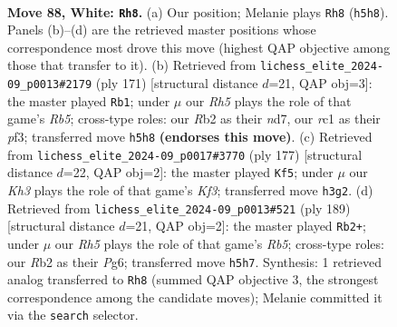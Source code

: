 \documentclass[11pt]{article}
\begin{document}
\clearpage

\begin{figure}[p]\centering
\begin{subfigure}{0.46\textwidth}\centering
\resizebox{\linewidth}{!}{%
\newchessgame
\chessboard[
  setfen={8/5k2/4pp2/7R/P3P3/5P1K/1R6/2r5 w - - 2 88},
  showmover=false,
  pgfstyle=straightmove, color=movearrow, markmove={h5-h8}
]}
\caption{}
\end{subfigure}\hfill
\begin{subfigure}{0.46\textwidth}\centering
\resizebox{\linewidth}{!}{%
\newchessgame
\chessboard[
  setfen={8/3N4/6p1/P5P1/1r1k3P/5PK1/8/8 b - - 1 86},
  showmover=false,
  pgfstyle=straightmove, color=movearrow, markmove={b4-b1}
]}
\caption{}
\end{subfigure}
\\[4pt]
\begin{subfigure}{0.46\textwidth}\centering
\resizebox{\linewidth}{!}{%
\newchessgame
\chessboard[
  setfen={8/8/R4kp1/7p/7P/6PK/5r2/8 b - - 15 89},
  showmover=false,
  pgfstyle=straightmove, color=movearrow, markmove={f6-f5}
]}
\caption{}
\end{subfigure}\hfill
\begin{subfigure}{0.46\textwidth}\centering
\resizebox{\linewidth}{!}{%
\newchessgame
\chessboard[
  setfen={R7/6k1/6p1/7p/1r5P/5PP1/6K1/8 b - - 0 95},
  showmover=false,
  pgfstyle=straightmove, color=movearrow, markmove={b4-b2}
]}
\caption{}
\end{subfigure}
\caption{\textbf{Move 88, White: \texttt{Rh8}.} (a) Our position; Melanie plays \texttt{Rh8} (\texttt{h5h8}). Panels (b)--(d) are the retrieved master positions whose correspondence most drove this move (highest QAP objective among those that transfer to it). (b) Retrieved from \texttt{lichess\_elite\_2024-09\_p0013\#2179} (ply 171) [structural distance $d$=21, QAP obj=3]: the master played \texttt{Rb1}; under $\mu$ our \emph{Rh5} plays the role of that game's \emph{Rb5}; cross-type roles: our \emph{R}b2 as their \emph{n}d7, our \emph{r}c1 as their \emph{p}f3; transferred move \texttt{h5h8} \textbf{(endorses this move)}. (c) Retrieved from \texttt{lichess\_elite\_2024-09\_p0017\#3770} (ply 177) [structural distance $d$=22, QAP obj=2]: the master played \texttt{Kf5}; under $\mu$ our \emph{Kh3} plays the role of that game's \emph{Kf3}; transferred move \texttt{h3g2}. (d) Retrieved from \texttt{lichess\_elite\_2024-09\_p0013\#521} (ply 189) [structural distance $d$=21, QAP obj=2]: the master played \texttt{Rb2+}; under $\mu$ our \emph{Rh5} plays the role of that game's \emph{Rb5}; cross-type roles: our \emph{R}b2 as their \emph{P}g6; transferred move \texttt{h5h7}. Synthesis: 1 retrieved analog transferred to \texttt{Rh8} (summed QAP objective 3, the strongest correspondence among the candidate moves); Melanie committed it via the \texttt{search} selector.}
\label{fig:thought-m174}
\end{figure}
\end{document}
